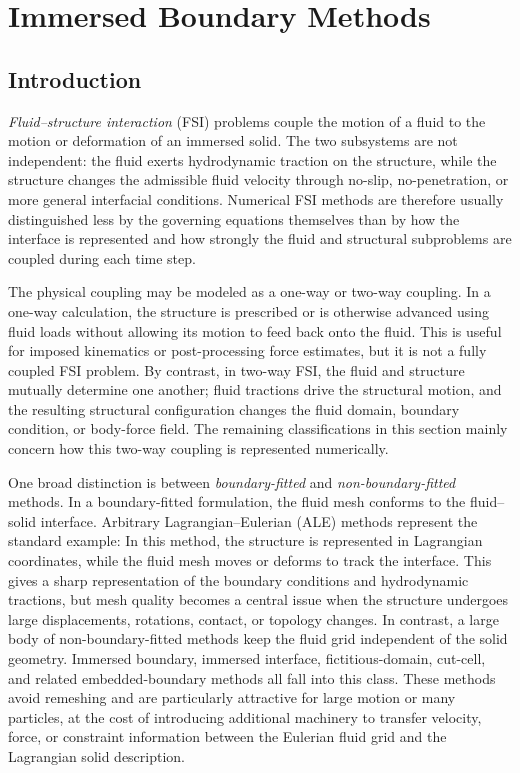 \chapter{Immersed Boundary Methods}
\label{chap:immersed-boundary-methods}

\section{Introduction}

\emph{Fluid--structure interaction} (FSI) problems couple the motion of a fluid to the
motion or deformation of an immersed solid. The two subsystems are not
independent: the fluid exerts hydrodynamic traction on the structure, while the
structure changes the admissible fluid velocity through no-slip,
no-penetration, or more general interfacial conditions. Numerical FSI methods
are therefore usually distinguished less by the governing equations themselves
than by how the interface is represented and how strongly the fluid and
structural subproblems are coupled during each time step.

The physical coupling may be modeled as a one-way or two-way coupling. In a
one-way calculation, the structure is prescribed or is otherwise advanced using
fluid loads without allowing its motion to feed back onto the fluid. This is
useful for imposed kinematics or post-processing force estimates, but it is not
a fully coupled FSI problem. By contrast, in two-way FSI, the fluid and
structure mutually determine one another; fluid tractions drive the structural
motion, and the resulting structural configuration changes the fluid domain,
boundary condition, or body-force field. The remaining classifications in this
section mainly concern how this two-way coupling is represented numerically.

One broad distinction is between \emph{boundary-fitted} and
\emph{non-boundary-fitted} methods. In a boundary-fitted formulation, the fluid
mesh conforms to the fluid--solid interface. Arbitrary Lagrangian--Eulerian
(ALE) methods represent the standard example: In this method, the structure is
represented in Lagrangian coordinates, while the fluid mesh moves or deforms to
track the interface. This gives a sharp representation of the boundary
conditions and hydrodynamic tractions, but mesh quality becomes a central issue
when the structure undergoes large displacements, rotations, contact, or
topology changes. In contrast, a large body of non-boundary-fitted methods keep
the fluid grid independent of the solid geometry. Immersed boundary, immersed
interface, fictitious-domain, cut-cell, and related embedded-boundary methods
all fall into this class. These methods avoid remeshing and are particularly
attractive for large motion or many particles, at the cost of introducing
additional machinery to transfer velocity, force, or constraint information
between the Eulerian fluid grid and the Lagrangian solid description.


